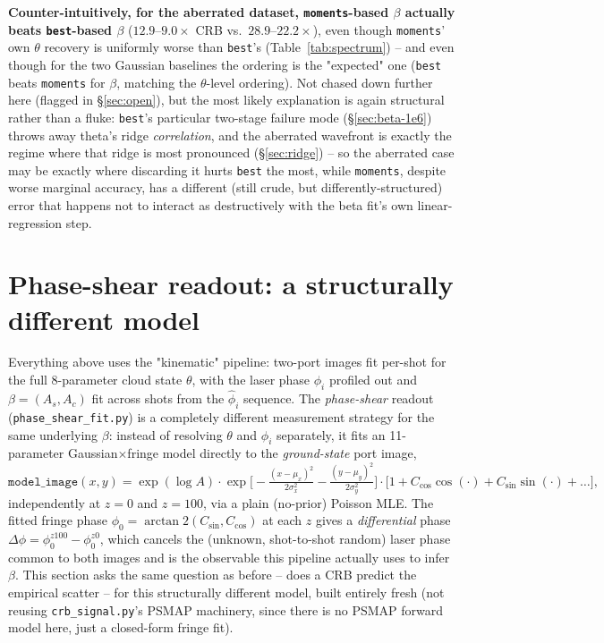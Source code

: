 \documentclass[11pt,a4paper]{article}
\newcommand{\code}[1]{\texttt{#1}}
\begin{document}
\textbf{Counter-intuitively, for the aberrated dataset, \code{moments}-based
$\beta$ actually beats \code{best}-based $\beta$} ($12.9$--$9.0\times$ CRB
vs.\ $28.9$--$22.2\times$), even though \code{moments}' own $\theta$
recovery is uniformly worse than \code{best}'s
(Table~\ref{tab:spectrum}) -- and even though for the two Gaussian
baselines the ordering is the "expected" one (\code{best} beats
\code{moments} for $\beta$, matching the $\theta$-level ordering). Not
chased down further here (flagged in \S\ref{sec:open}), but the most
likely explanation is again structural rather than a fluke: \code{best}'s
particular two-stage failure mode (\S\ref{sec:beta-1e6}) throws away
theta's ridge \emph{correlation}, and the aberrated wavefront is exactly the
regime where that ridge is most pronounced (\S\ref{sec:ridge}) -- so the
aberrated case may be exactly where discarding it hurts \code{best} the
most, while \code{moments}, despite worse marginal accuracy, has a
different (still crude, but differently-structured) error that happens not
to interact as destructively with the beta fit's own linear-regression
step.

\section{Phase-shear readout: a structurally different model}
\label{sec:phase-shear}

Everything above uses the "kinematic" pipeline: two-port images fit
per-shot for the full 8-parameter cloud state $\theta$, with the laser
phase $\phi_i$ profiled out and $\beta=(A_s,A_c)$ fit across shots from the
$\hat\phi_i$ sequence. The \emph{phase-shear} readout
(\code{phase\_shear\_fit.py}) is a completely different measurement
strategy for the same underlying $\beta$: instead of resolving $\theta$ and
$\phi_i$ separately, it fits an 11-parameter Gaussian$\times$fringe model
directly to the \emph{ground-state} port image,
\[
  \code{model\_image}(x,y) = \exp(\log A)\cdot
  \exp\!\Big[-\tfrac{(x-\mu_x)^2}{2\sigma_x^2}-\tfrac{(y-\mu_y)^2}{2\sigma_y^2}\Big]
  \cdot\big[1 + C_{\cos}\cos(\cdot) + C_{\sin}\sin(\cdot) + \dots\big],
\]
independently at $z{=}0$ and $z{=}100$, via a plain (no-prior) Poisson MLE.
The fitted fringe phase $\phi_0=\arctan2(C_{\sin},C_{\cos})$ at each $z$
gives a \emph{differential} phase $\Delta\phi = \phi_0^{z100}-\phi_0^{z0}$,
which cancels the (unknown, shot-to-shot random) laser phase common to both
images and is the observable this pipeline actually uses to infer $\beta$.
This section asks the same question as before -- does a CRB predict the
empirical scatter -- for this structurally different model, built entirely
fresh (not reusing \code{crb\_signal.py}'s PSMAP machinery, since there is
no PSMAP forward model here, just a closed-form fringe fit).
\end{document}
